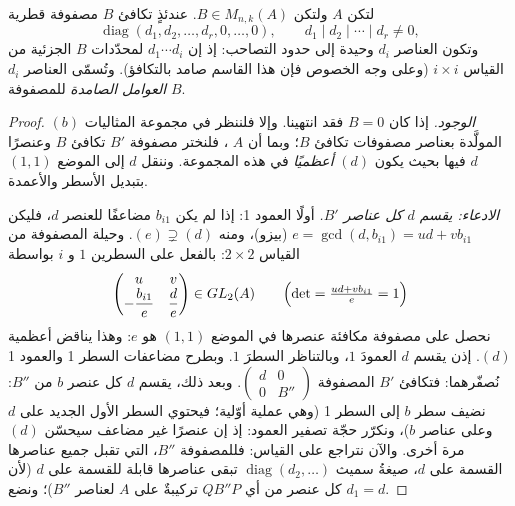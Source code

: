 \begin{theorem}\label{thm:b3:modules:smith}
لتكن $A$  ولتكن $B \in M_{n,k}(A)$. عندئذٍ تكافئ $B$ مصفوفة
قطرية
\[
\operatorname{diag}(d_1, d_2, \dots, d_r, 0, \dots, 0),
\qquad d_1 \mid d_2 \mid \cdots \mid d_r \neq 0 ,
\]
وتكون العناصر $d_i$ وحيدة إلى حدود التصاحب: إذ إن
$d_1 \cdots d_i$  لمحدّدات $B$ الجزئية من القياس
$i \times i$ (وعلى وجه الخصوص فإن هذا القاسم صامد بالتكافؤ). وتُسمّى
العناصر $d_i$ \emph{العوامل الصامدة} للمصفوفة
$B$.
\end{theorem}

\begin{proof}
\emph{الوجود.} إذا كان $B = 0$ فقد انتهينا. وإلا فلننظر في مجموعة
المثاليات $(b)$ المولَّدة بعناصر مصفوفات تكافئ $B$؛ وبما أن $A$
، فلنختر مصفوفة $B'$ تكافئ $B$ وعنصرًا $d$ فيها بحيث يكون
$(d)$ \emph{أعظميًا} في هذه المجموعة. وننقل $d$ إلى الموضع $(1,1)$
بتبديل الأسطر والأعمدة.

\emph{الادعاء: يقسم $d$ كل عناصر $B'$.} أولًا العمود 1: إذا لم يكن
$b_{i1}$ مضاعفًا للعنصر $d$، فليكن $e = \gcd(d, b_{i1}) = ud +
vb_{i1}$ (بيزو)، ومنه $(e) \supsetneq (d)$. وحيلة
المصفوفة من القياس $2 \times 2$: بالفعل على السطرين $1$ و $i$
بواسطة
\[
\begin{pmatrix} u & v \\ -\dfrac{b_{i1}}e & \dfrac de
\end{pmatrix}
\in GL_2(A)
\qquad
\Bigl(\det = \tfrac{ud + v b_{i1}}e = 1\Bigr)
\]
نحصل على مصفوفة مكافئة عنصرها في الموضع $(1,1)$ هو $e$: وهذا
يناقض أعظمية $(d)$. إذن يقسم $d$ العمودَ $1$، وبالتناظر السطرَ
$1$. وبطرح مضاعفات السطر 1 والعمود 1 نُصفّرهما: فتكافئ $B'$ المصفوفة
$\begin{pmatrix} d &
0\\ 0 & B''\end{pmatrix}$. وبعد ذلك، يقسم $d$ كل عنصر $b$ من $B''$: نضيف سطر $b$
إلى السطر 1 (وهي عملية أوّلية؛ فيحتوي السطر الأول الجديد على $d$
وعلى عناصر $b$)، ونكرّر حجّة تصفير العمود: إذ إن عنصرًا غير مضاعف
سيحسّن $(d)$ مرة أخرى. والآن نتراجع على القياس: فللمصفوفة $B''$، التي
تقبل جميع عناصرها القسمة على $d$، صيغةُ سميث $\operatorname{diag}(d_2,
\dots)$ تبقى عناصرها
قابلة للقسمة على $d$ (لأن كل عنصر من أي $QB''P$ تركيبةٌ على $A$
لعناصر $B''$)؛ ونضع $d_1 =
d$.


\end{proof}
